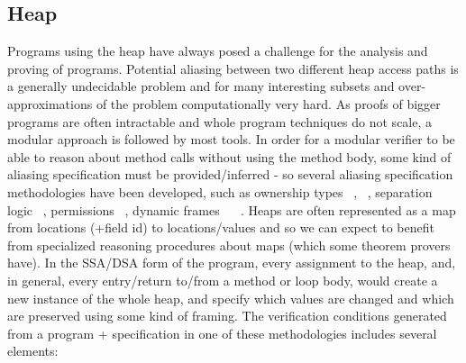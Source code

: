 	\subsection{Heap}
	Programs using the heap have always posed a challenge for the analysis and proving of programs.
	Potential aliasing between two different heap access paths is a generally undecidable problem and for many interesting subsets and over-approximations of the problem computationally very hard.
	As proofs of bigger programs are often intractable and whole program techniques do not scale, a modular approach is followed by most tools.
	In order for a modular verifier to be able to reason about method calls without using the method body, some kind of aliasing specification must be provided/inferred - so several aliasing specification methodologies have been developed, such as ownership types ~\cite{DBLP:conf/ecoop/ClarkeNP01}, ~\cite{DBLP:books/sp/Muller02}, separation logic ~\cite{DBLP:conf/lics/Reynolds02}, permissions ~\cite{DBLP:conf/sas/Boyland03}, dynamic frames ~\cite{DBLP:conf/fm/Kassios06} ~\cite{DBLP:conf/lpar/Leino10}.
	Heaps are often represented as a map from locations (+field id) to locations/values and so we can expect to benefit from specialized reasoning procedures about maps (which some theorem provers have).
	In the SSA/DSA form of the program, every assignment to the heap, and, in general, every entry/return to/from a method or loop body, would create a new instance of the whole heap, and specify which values are changed and which are preserved using some kind of framing.
	The verification conditions generated from a program + specification in one of these methodologies includes several elements:
